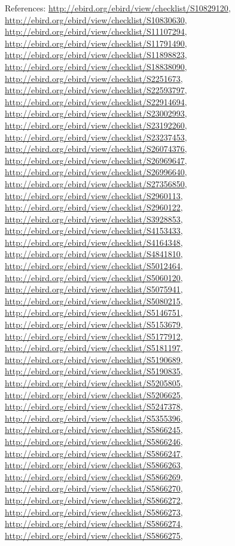 \documentclass[9pt, article]{memoir}
\begin{document}
\begin{multicols}{2}
\vspace{6pt}References: 
\url{http://ebird.org/ebird/view/checklist/S10829120}, 
\url{http://ebird.org/ebird/view/checklist/S10830630}, 
\url{http://ebird.org/ebird/view/checklist/S11107294}, 
\url{http://ebird.org/ebird/view/checklist/S11791490}, 
\url{http://ebird.org/ebird/view/checklist/S11898823}, 
\url{http://ebird.org/ebird/view/checklist/S18838090}, 
\url{http://ebird.org/ebird/view/checklist/S2251673}, 
\url{http://ebird.org/ebird/view/checklist/S22593797}, 
\url{http://ebird.org/ebird/view/checklist/S22914694}, 
\url{http://ebird.org/ebird/view/checklist/S23002993}, 
\url{http://ebird.org/ebird/view/checklist/S23192260}, 
\url{http://ebird.org/ebird/view/checklist/S23237453}, 
\url{http://ebird.org/ebird/view/checklist/S26074376}, 
\url{http://ebird.org/ebird/view/checklist/S26969647}, 
\url{http://ebird.org/ebird/view/checklist/S26996640}, 
\url{http://ebird.org/ebird/view/checklist/S27356850}, 
\url{http://ebird.org/ebird/view/checklist/S2960113}, 
\url{http://ebird.org/ebird/view/checklist/S2960122}, 
\url{http://ebird.org/ebird/view/checklist/S3928853}, 
\url{http://ebird.org/ebird/view/checklist/S4153433}, 
\url{http://ebird.org/ebird/view/checklist/S4164348}, 
\url{http://ebird.org/ebird/view/checklist/S4841810}, 
\url{http://ebird.org/ebird/view/checklist/S5012464}, 
\url{http://ebird.org/ebird/view/checklist/S5060120}, 
\url{http://ebird.org/ebird/view/checklist/S5075941}, 
\url{http://ebird.org/ebird/view/checklist/S5080215}, 
\url{http://ebird.org/ebird/view/checklist/S5146751}, 
\url{http://ebird.org/ebird/view/checklist/S5153679}, 
\url{http://ebird.org/ebird/view/checklist/S5177912}, 
\url{http://ebird.org/ebird/view/checklist/S5181197}, 
\url{http://ebird.org/ebird/view/checklist/S5190689}, 
\url{http://ebird.org/ebird/view/checklist/S5190835}, 
\url{http://ebird.org/ebird/view/checklist/S5205805}, 
\url{http://ebird.org/ebird/view/checklist/S5206625}, 
\url{http://ebird.org/ebird/view/checklist/S5247378}, 
\url{http://ebird.org/ebird/view/checklist/S5355396}, 
\url{http://ebird.org/ebird/view/checklist/S5866245}, 
\url{http://ebird.org/ebird/view/checklist/S5866246}, 
\url{http://ebird.org/ebird/view/checklist/S5866247}, 
\url{http://ebird.org/ebird/view/checklist/S5866263}, 
\url{http://ebird.org/ebird/view/checklist/S5866269}, 
\url{http://ebird.org/ebird/view/checklist/S5866270}, 
\url{http://ebird.org/ebird/view/checklist/S5866272}, 
\url{http://ebird.org/ebird/view/checklist/S5866273}, 
\url{http://ebird.org/ebird/view/checklist/S5866274}, 
\url{http://ebird.org/ebird/view/checklist/S5866275}, 

\end{multicols}
\end{document}

